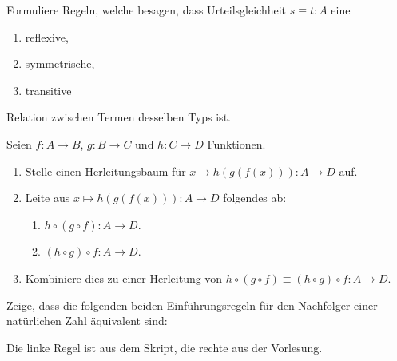\documentclass{uebung}
\begin{document}

\begin{exercise}
  Formuliere Regeln, welche besagen, dass Urteilsgleichheit $s\equiv t:A$ eine
  \begin{enumerate}
    \item reflexive,
    \item symmetrische,
    \item transitive
  \end{enumerate}
  Relation zwischen Termen desselben Typs ist.
\end{exercise}

\begin{exercise}
  Seien $f:A\to B$, $g:B\to C$ und $h:C\to D$ Funktionen.
  \begin{enumerate}
    \item Stelle einen Herleitungsbaum für $x\mapsto h(g(f(x))):A\to D$ auf.
    \item Leite aus $x\mapsto h(g(f(x))):A\to D$ folgendes ab:
      \begin{enumerate}
        \item $h\circ (g\circ f):A\to D$.
        \item $(h\circ g)\circ f:A\to D$.
      \end{enumerate}
    \item Kombiniere dies zu einer Herleitung von $h\circ(g\circ f)\equiv (h\circ g)\circ f:A\to D$.
  \end{enumerate}
\end{exercise}

\begin{exercise}
  Zeige, dass die folgenden beiden Einführungsregeln für den Nachfolger einer natürlichen Zahl äquivalent sind:
  {\tiny Die linke Regel ist aus dem Skript, die rechte aus der Vorlesung.}
\end{exercise}
\end{document}
